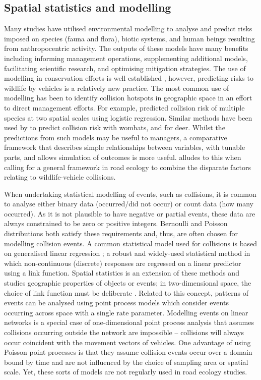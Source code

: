 \subsection{Spatial statistics and modelling}

Many studies have utilised environmental modelling to analyse and predict risks imposed on species (fauna and flora), biotic systems, and human beings resulting from anthropocentric activity. The outputs of these models have many benefits including informing management operations, supplementing additional models, facilitating scientific research, and optimising mitigation strategies. The use of modelling in conservation efforts is well established \citep{star86}, however, predicting risks to wildlife by vehicles is a relatively new practice. The most common use of modelling has been to identify collision hotspots in geographic space in an effort to direct management efforts. For example, \cite{malo04} predicted collision risk of multiple species at two spatial scales using logistic regression. Similar methods have been used by \cite{roge09} to predict collision risk with wombats, and \cite{sudh09} for deer. Whilst the predictions from such models may be useful to managers, a comparative framework that describes simple relationships between variables, with tunable parts, and allows simulation of outcomes is more useful. \cite{clev15} alludes to this when calling for a general framework in road ecology to combine the disparate factors relating to wildlife-vehicle collisions.

When undertaking statistical modelling of events, such as collisions, it is common to analyse either binary data (occurred/did not occur) or count data (how many occurred).  As it is not plausible to have negative or partial events, these data are always constrained to be zero or positive integers. Bernoulli and Poisson distributions both satisfy these requirements and, thus, are often chosen for modelling collision events. A common statistical model used for collisions is based on generalised linear regression \citep{mccu89}; a robust and widely-used statistical method in which non-continuous (discrete) responses are regressed on a linear predictor using a link function. Spatial statistics is an extension of these methods and studies geographic properties of objects or events; in two-dimensional space, the choice of link function must be deliberate \citep{badd10}. Related to this concept, patterns of events can be analysed using point process models which consider events occurring across space with a single rate parameter. Modelling events on linear networks is a special case of one-dimensional point process analysis that assumes collisions occurring outside the network are impossible \citep{okab09} -- collisions will always occur coincident with the movement vectors of vehicles. One advantage of using Poisson point processes is that they assume collision events occur over a domain bound by time and are not influenced by the choice of sampling area or spatial scale. Yet, these sorts of models are not regularly used in road ecology studies.

